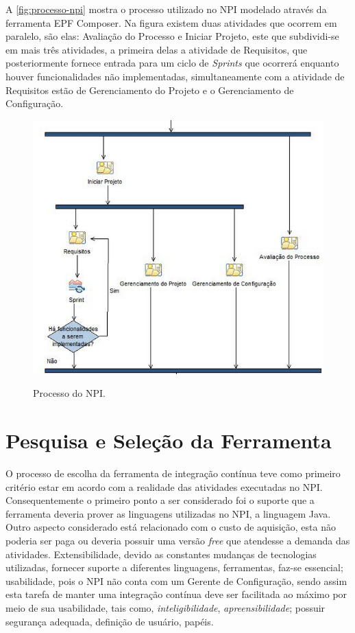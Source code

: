 A \autoref{fig:processo-npi} mostra o processo utilizado no NPI modelado através da ferramenta EPF Composer. Na figura	existem duas atividades que ocorrem em paralelo, são elas: Avaliação do Processo e Iniciar Projeto, este que subdividi-se em mais três atividades, a primeira delas a atividade de Requisitos, que posteriormente fornece entrada para um ciclo de \textit{Sprints} que ocorrerá enquanto houver funcionalidades não implementadas, simultaneamente com a atividade de Requisitos estão de Gerenciamento do Projeto e o Gerenciamento de Configuração.
\begin{figure}[H]
\centering
\caption[Processo do NPI]{Processo do NPI.}
\includegraphics[scale=0.8]{./images/processo-npi}
\label{fig:processo-npi}
\end{figure}

\section{Pesquisa e Seleção da Ferramenta}\label{pesq-selecao}
O processo de escolha da ferramenta de integração contínua teve como primeiro critério estar em acordo com a realidade das atividades executadas no NPI. Consequentemente o primeiro ponto a ser considerado foi o suporte que a ferramenta deveria prover as linguagens utilizadas no NPI, a linguagem Java. Outro aspecto considerado está relacionado com o custo de aquisição, esta não poderia ser paga ou deveria possuir uma versão \textit{free} que atendesse a demanda das atividades. Extensibilidade, devido as constantes mudanças de tecnologias utilizadas, fornecer suporte a diferentes linguagens, ferramentas, faz-se essencial; usabilidade, pois o NPI não conta com um Gerente de Configuração, sendo assim esta tarefa de manter uma integração contínua deve ser facilitada ao máximo por meio de sua usabilidade, tais como, \textit{inteligibilidade}, \textit{apreensibilidade}; possuir segurança adequada, definição de usuário, papéis.

